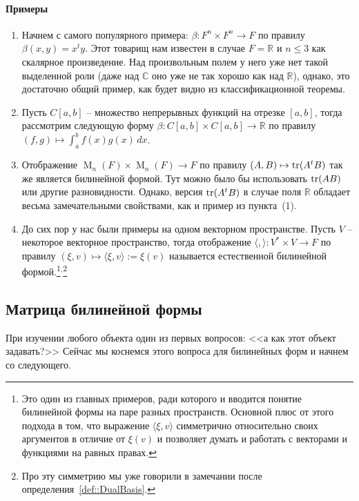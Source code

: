 \paragraph{Примеры}
\begin{enumerate}
\item Начнем с самого популярного примера: $\beta\colon F^n\times F^n \to F$ по правилу $\beta(x,y) = x^t y$. Этот товарищ нам известен в случае $F = \mathbb R$ и $n\leqslant 3$ как скалярное произведение. Над произвольным полем у него уже нет такой выделенной роли (даже над $\mathbb C$ оно уже не так хорошо как над $\mathbb R$), однако, это достаточно общий пример, как будет видно из классификационной теоремы.

\item Пусть $C[a,b]$ -- множество непрерывных функций на отрезке $[a,b]$, тогда рассмотрим следующую форму $\beta\colon C[a,b]\times C[a,b]\to \mathbb R$ по правилу $(f,g)\mapsto \int_a^b f(x)g(x)\,dx$.

\item Отображение $\operatorname{M}_n(F)\times \operatorname{M}_n(F)\to F$ по правилу $(A,B)\mapsto \operatorname{tr}(A^tB)$ так же является билинейной формой. Тут можно было бы использовать $\operatorname{tr}(AB)$ или другие разновидности. Однако, версия $\operatorname{tr}(A^tB)$ в случае поля $\mathbb R$ обладает весьма замечательными свойствами, как и пример из пункта~(1).

\item До сих пор у нас были примеры на одном векторном пространстве. Пусть $V$ -- некоторое векторное пространство, тогда отображение $\langle,\rangle\colon V^*\times V\to F$ по правилу $(\xi,v)\mapsto \langle\xi,v\rangle := \xi(v)$ называется естественной билинейной формой.\footnote{Это один из главных примеров, ради которого и вводится понятие билинейной формы на паре разных пространств. Основной плюс от этого подхода в том, что выражение $\langle \xi,v\rangle$ симметрично относительно своих аргументов в отличие от $\xi(v)$ и позволяет думать и работать с векторами и функциями на равных правах.}${}^{,}$\footnote{Про эту симметрию мы уже говорили в замечании после определения~\ref{def::DualBasis}.}
\end{enumerate}

\subsection{Матрица билинейной формы}


При изучении любого объекта один из первых вопросов: <<а как этот объект задавать?>> Сейчас мы коснемся этого вопроса для билинейных форм и начнем со следующего.


